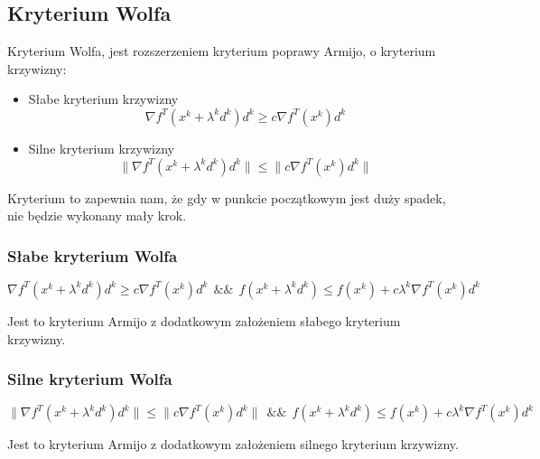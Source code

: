 \documentclass{classrep}
\begin{document}
\subsection{Kryterium Wolfa}

Kryterium Wolfa, jest rozszerzeniem kryterium poprawy Armijo, o kryterium krzywizny:
\begin{itemize}
\item Słabe kryterium krzywizny\\
	\begin{equation}
	\nabla f^{T} (x^{k} + \lambda ^{k} d^{k} ) d^{k} \geq c \nabla f^{T} (x ^{k} ) d^{k}
	\end{equation}
	
\item Silne kryterium krzywizny\\
	\begin{equation}
	\| \nabla f^{T} (x^{k} + \lambda ^{k} d^{k} ) d^{k} \| \leq \| c \nabla f^{T} (x ^{k} ) d^{k} \|
	\end{equation}

\end{itemize}

Kryterium to zapewnia nam, że gdy w punkcie początkowym jest duży spadek, nie będzie wykonany mały krok.


\subsubsection{Słabe kryterium Wolfa}
\begin{equation}
	\nabla f^{T} (x^{k} + \lambda ^{k} d^{k} ) d^{k} \geq c \nabla f^{T} (x ^{k} ) d^{k}  \ \ \&\& \ \ 
	f( x^{k} + \lambda ^{k} d^{k} ) \leq f(x^{k}) + c \lambda ^{k} \nabla f^{T} (x ^{k} ) d^{k}
\end{equation}

Jest to kryterium Armijo z dodatkowym założeniem słabego kryterium krzywizny.

\subsubsection{Silne kryterium Wolfa}
\begin{equation}
	\| \nabla f^{T} (x^{k} + \lambda ^{k} d^{k} ) d^{k} \| \leq \| c \nabla f^{T} (x ^{k} ) d^{k} \| \ \ \&\& \ \ 
	f( x^{k} + \lambda ^{k} d^{k} ) \leq f(x^{k}) + c \lambda ^{k} \nabla f^{T} (x ^{k} ) d^{k}
\end{equation}

Jest to kryterium Armijo z dodatkowym założeniem silnego kryterium krzywizny.
\end{document}
